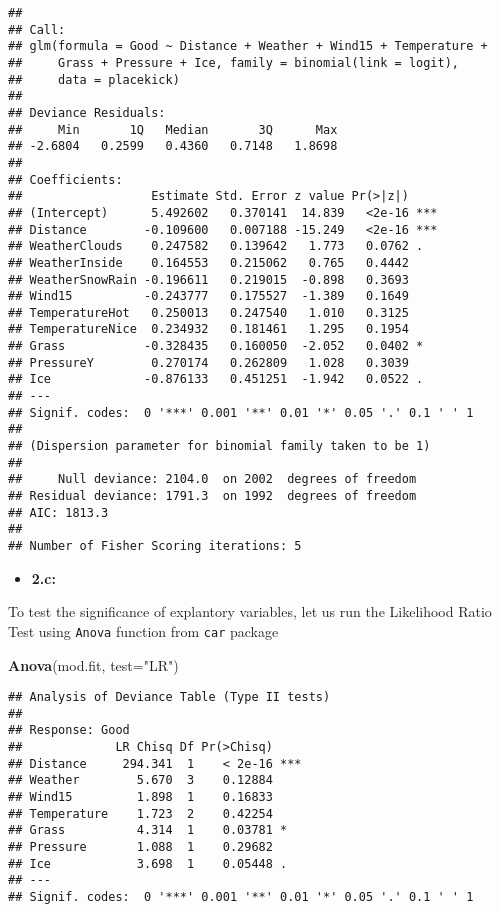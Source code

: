 \documentclass[]{article}
\newenvironment{Shaded}{\begin{snugshade}}{\end{snugshade}}
\newcommand{\DataTypeTok}[1]{\textcolor[rgb]{0.13,0.29,0.53}{#1}}
\newcommand{\KeywordTok}[1]{\textcolor[rgb]{0.13,0.29,0.53}{\textbf{#1}}}
\newcommand{\NormalTok}[1]{#1}
\newcommand{\StringTok}[1]{\textcolor[rgb]{0.31,0.60,0.02}{#1}}
\providecommand{\tightlist}{%
  \setlength{\itemsep}{0pt}\setlength{\parskip}{0pt}}
\begin{document}
\begin{verbatim}
## 
## Call:
## glm(formula = Good ~ Distance + Weather + Wind15 + Temperature + 
##     Grass + Pressure + Ice, family = binomial(link = logit), 
##     data = placekick)
## 
## Deviance Residuals: 
##     Min       1Q   Median       3Q      Max  
## -2.6804   0.2599   0.4360   0.7148   1.8698  
## 
## Coefficients:
##                  Estimate Std. Error z value Pr(>|z|)    
## (Intercept)      5.492602   0.370141  14.839   <2e-16 ***
## Distance        -0.109600   0.007188 -15.249   <2e-16 ***
## WeatherClouds    0.247582   0.139642   1.773   0.0762 .  
## WeatherInside    0.164553   0.215062   0.765   0.4442    
## WeatherSnowRain -0.196611   0.219015  -0.898   0.3693    
## Wind15          -0.243777   0.175527  -1.389   0.1649    
## TemperatureHot   0.250013   0.247540   1.010   0.3125    
## TemperatureNice  0.234932   0.181461   1.295   0.1954    
## Grass           -0.328435   0.160050  -2.052   0.0402 *  
## PressureY        0.270174   0.262809   1.028   0.3039    
## Ice             -0.876133   0.451251  -1.942   0.0522 .  
## ---
## Signif. codes:  0 '***' 0.001 '**' 0.01 '*' 0.05 '.' 0.1 ' ' 1
## 
## (Dispersion parameter for binomial family taken to be 1)
## 
##     Null deviance: 2104.0  on 2002  degrees of freedom
## Residual deviance: 1791.3  on 1992  degrees of freedom
## AIC: 1813.3
## 
## Number of Fisher Scoring iterations: 5
\end{verbatim}

\begin{itemize}
\tightlist
\item
  \textbf{2.c:}
\end{itemize}

To test the significance of explantory variables, let us run the
Likelihood Ratio Test using \texttt{Anova} function from \texttt{car}
package

\begin{Shaded}
\begin{Highlighting}[]
\KeywordTok{Anova}\NormalTok{(mod.fit, }\DataTypeTok{test=}\StringTok{"LR"}\NormalTok{)}
\end{Highlighting}
\end{Shaded}

\begin{verbatim}
## Analysis of Deviance Table (Type II tests)
## 
## Response: Good
##             LR Chisq Df Pr(>Chisq)    
## Distance     294.341  1    < 2e-16 ***
## Weather        5.670  3    0.12884    
## Wind15         1.898  1    0.16833    
## Temperature    1.723  2    0.42254    
## Grass          4.314  1    0.03781 *  
## Pressure       1.088  1    0.29682    
## Ice            3.698  1    0.05448 .  
## ---
## Signif. codes:  0 '***' 0.001 '**' 0.01 '*' 0.05 '.' 0.1 ' ' 1
\end{verbatim}
\end{document}
